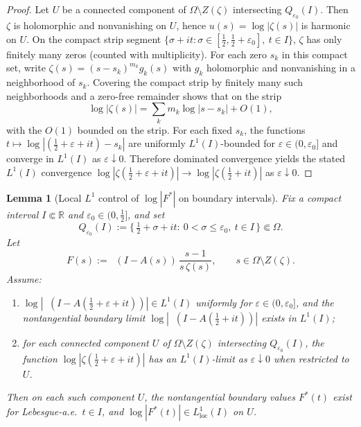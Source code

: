 \documentclass[11pt]{amsart}
\newtheorem{lemma}[theorem]{Lemma}
\theoremstyle{definition}
\theoremstyle{remark}
\DeclareMathOperator{\dettwo}{det_2}
\begin{document}
\begin{proof}
Let $U$ be a connected component of $\Omega\setminus Z(\zeta)$ intersecting $Q_{\varepsilon_0}(I)$. Then $\zeta$ is holomorphic and nonvanishing on $U$, hence $u(s)=\log|\zeta(s)|$ is harmonic on $U$.
On the compact strip segment $\{\sigma+it:\sigma\in[\tfrac12,\tfrac12+\varepsilon_0],\ t\in I\}$, $\zeta$ has only finitely many zeros (counted with multiplicity).
For each zero $s_k$ in this compact set, write $\zeta(s)=(s-s_k)^{m_k}g_k(s)$ with $g_k$ holomorphic and nonvanishing in a neighborhood of $s_k$.
Covering the compact strip by finitely many such neighborhoods and a zero-free remainder shows that on the strip
\[
\log|\zeta(s)|=\sum_k m_k\log|s-s_k| + O(1),
\]
with the $O(1)$ bounded on the strip.
For each fixed $s_k$, the functions $t\mapsto \log|(\tfrac12+\varepsilon+it)-s_k|$ are uniformly $L^1(I)$-bounded for $\varepsilon\in(0,\varepsilon_0]$ and converge in $L^1(I)$ as $\varepsilon\downarrow 0$.
Therefore dominated convergence yields the stated $L^1(I)$ convergence
\(
\log|\zeta(\tfrac12+\varepsilon+it)|\to \log|\zeta(\tfrac12+it)|
\)
as $\varepsilon\downarrow0$.
\end{proof}
\begin{lemma}[Local $L^1$ control of $\log|F^*|$ on boundary intervals]\label{lem:F-logL1-local}
Fix a compact interval $I\Subset\mathbb R$ and $\varepsilon_0\in(0,\tfrac12]$, and set
\[
Q_{\varepsilon_0}(I):=\{\,\tfrac12+\sigma+it:\ 0<\sigma\le \varepsilon_0,\ t\in I\,\}\Subset\Omega.
\]
Let
\[
F(s):=\dettwo(I-A(s))\,\frac{s-1}{s\,\zeta(s)},\qquad s\in\Omega\setminus Z(\zeta).
\]
Assume:
\begin{enumerate}
\item[(i)] $\log|\dettwo(I-A(\tfrac12+\varepsilon+it))|\in L^1(I)$ uniformly for $\varepsilon\in(0,\varepsilon_0]$, and the nontangential boundary limit
$\log|\dettwo(I-A(\tfrac12+it))|$ exists in $L^1(I)$;
\item[(ii)] for each connected component $U$ of $\Omega\setminus Z(\zeta)$ intersecting $Q_{\varepsilon_0}(I)$, the function $\log|\zeta(\tfrac12+\varepsilon+it)|$ has an $L^1(I)$-limit as $\varepsilon\downarrow0$ when restricted to $U$.
\end{enumerate}
Then on each such component $U$, the nontangential boundary values $F^*(t)$ exist for Lebesgue-a.e.\ $t\in I$, and $\log|F^*(t)|\in L^1_{\mathrm{loc}}(I)$ on $U$.
\end{lemma}
\end{document}
